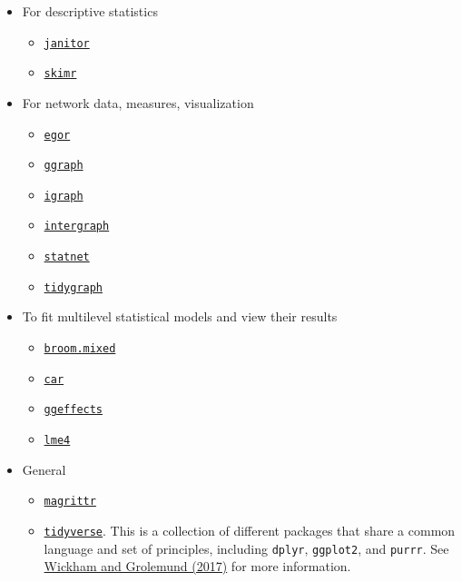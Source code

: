\documentclass[
]{book}
\providecommand{\tightlist}{%
  \setlength{\itemsep}{0pt}\setlength{\parskip}{0pt}}
\begin{document}
\begin{itemize}
\tightlist
\item
  For descriptive statistics

  \begin{itemize}
  \tightlist
  \item
    \href{https://cran.r-project.org/web/packages/janitor/vignettes/janitor.html}{\texttt{janitor}}
  \item
    \href{https://cran.r-project.org/web/packages/skimr/vignettes/skimr.html}{\texttt{skimr}}
  \end{itemize}
\item
  For network data, measures, visualization

  \begin{itemize}
  \tightlist
  \item
    \href{https://github.com/tilltnet/egor}{\texttt{egor}}
  \item
    \href{https://github.com/thomasp85/ggraph}{\texttt{ggraph}}
  \item
    \href{https://igraph.org/}{\texttt{igraph}}
  \item
    \href{https://mbojan.github.io/intergraph/}{\texttt{intergraph}}
  \item
    \href{http://statnet.org/}{\texttt{statnet}}
  \item
    \href{https://github.com/thomasp85/tidygraph}{\texttt{tidygraph}}
  \end{itemize}
\item
  To fit multilevel statistical models and view their results

  \begin{itemize}
  \tightlist
  \item
    \href{https://cran.r-project.org/web/packages/broom.mixed/vignettes/broom_mixed_intro.html}{\texttt{broom.mixed}}
  \item
    \href{https://cran.r-project.org/web/packages/car/index.html}{\texttt{car}}
  \item
    \href{https://strengejacke.github.io/ggeffects/}{\texttt{ggeffects}}
  \item
    \href{https://github.com/lme4/lme4}{\texttt{lme4}}
  \end{itemize}
\item
  General

  \begin{itemize}
  \tightlist
  \item
    \href{https://magrittr.tidyverse.org/}{\texttt{magrittr}}
  \item
    \href{https://www.tidyverse.org/}{\texttt{tidyverse}}. This is a collection of different packages that share a common language and set of principles, including \texttt{dplyr}, \texttt{ggplot2}, and \texttt{purrr}. See \href{http://r4ds.had.co.nz/}{Wickham and Grolemund (2017)} for more information.
  \end{itemize}
\end{itemize}
\end{document}

